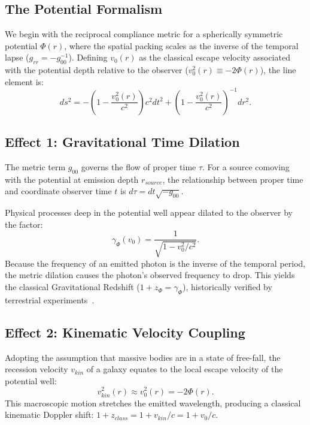 \documentclass[11pt]{article}
\begin{document}
\subsection{The Potential Formalism}
We begin with the reciprocal compliance metric for a spherically symmetric potential $\Phi(r)$, where the spatial packing scales as the inverse of the temporal lapse ($g_{rr} = -g_{00}^{-1}$). Defining $v_0(r)$ as the classical escape velocity associated with the potential depth relative to the observer ($v_0^2(r) \equiv -2\Phi(r)$), the line element is:
\begin{equation}
\label{eq:v0_metric}
ds^2 = -\left(1 - \frac{v_0^2(r)}{c^2}\right)c^2 dt^2 + \left(1 - \frac{v_0^2(r)}{c^2}\right)^{-1} dr^2.
\end{equation}

\subsection{Effect 1: Gravitational Time Dilation}
The metric term $g_{00}$ governs the flow of proper time $\tau$. For a source comoving with the potential at emission depth $r_{source}$, the relationship between proper time and coordinate observer time $t$ is $d\tau = dt \sqrt{-g_{00}}$. 

Physical processes deep in the potential well appear dilated to the observer by the factor:
\begin{equation}
\label{eq:grav_dilation}
\gamma_{\Phi}(v_0) = \frac{1}{\sqrt{1 - v_0^2/c^2}}.
\end{equation}
Because the frequency of an emitted photon is the inverse of the temporal period, the metric dilation causes the photon's observed frequency to drop. This yields the classical Gravitational Redshift ($1 + z_{\Phi} = \gamma_{\Phi}$), historically verified by terrestrial experiments~\cite{Pound1960}.

\subsection{Effect 2: Kinematic Velocity Coupling}
Adopting the assumption that massive bodies are in a state of free-fall, the recession velocity $v_{kin}$ of a galaxy equates to the local escape velocity of the potential well:
\begin{equation}
\label{eq:kinematic_coupling}
v_{kin}^2(r) \approx v_0^2(r) = -2\Phi(r).
\end{equation}
This macroscopic motion stretches the emitted wavelength, producing a classical kinematic Doppler shift: $1 + z_{class} = 1 + v_{kin}/c = 1 + v_0/c$.
\end{document}
